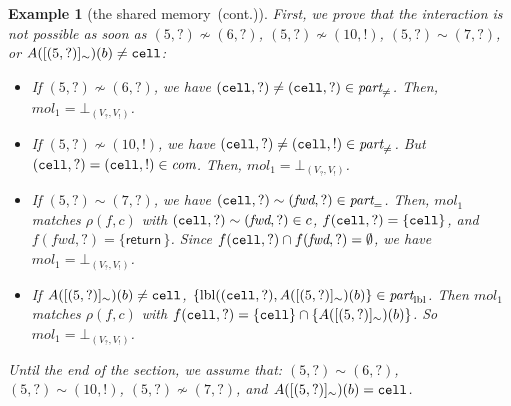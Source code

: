 \documentclass{article}
\newtheorem{example}[thm]{Example}
\newcommand{\rec}{?}
\newcommand{\eme}{!}
\newcommand{\internal}[1]{\textnormal{\texttt{#1}}}
\newcommand{\data}[1]{\textsf{#1}\,}
\newcommand{\variable}[1]{\textit{#1}}
\newcommand{\addread}{\data{return}}
\newcommand{\port}{\variable{fwd}}
\newcommand{\ccell}{\internal{cell}}
\newcommand{\memlabe}{5}
\newcommand{\memlabf}{6}
\newcommand{\memlabg}{7}
\newcommand{\memlabj}{10}
\newcommand{\Vrec}{V_{\rec}}
\newcommand{\Veme}{V_{\eme}}
\newcommand{\continued}{(cont.)}
\newcommand{\Moleculeshortkey}{}
\newcommand{\botmolecule}[2]{\bot^{\Moleculeshortkey}_{\scriptscriptstyle ({\scriptscriptstyle #1},{\scriptscriptstyle #2})}}
\newcommand{\shareanalysis}{the shared memory}
\newcommand{\cflowanalysis}{\shareanalysis\ \continued}
\begin{document}
\begin{example}[\cflowanalysis]
First, we prove that the interaction is not possible as soon as 
$(\memlabe,\rec)\not \sim (\memlabf,\rec)$, $(\memlabe,\rec)\not \sim(\memlabj,\eme)$, $(\memlabe,\rec)\sim(\memlabg,\rec)$, or   $A([(\memlabe,\rec)]_\sim)(b)\not =\ccell$:
\begin{itemize} 
\item If $(\memlabe,\rec)\not \sim (\memlabf,\rec)$, we have  $(\ccell,\rec)\not=(\ccell,\rec)\in\textit{part}_{\not =}$. Then,  $\textit{mol}_1 = \botmolecule{\Vrec}{\Veme}$.
\item If $(\memlabe,\rec)\not \sim (\memlabj,\eme)$, we have  $(\ccell,\rec)\not=(\ccell,\eme)\in\textit{part}_{\not =}$. 
But $(\ccell,\rec)=(\ccell,\eme)\in\textit{com}$. 
Then, $\textit{mol}_1 =\botmolecule{\Vrec}{\Veme}$.
\item 
If $(\memlabe,\rec)\sim(\memlabg,\rec)$, we have $(\ccell,\rec)\sim(\port,\rec)\in\textit{part}_=$.
Then, $\textit{mol}_1$ matches $\rho(f,c)$ with $(\ccell,\rec)\sim(\port,\rec)\in c$, $f(\ccell,\rec)=\{\ccell\}$, and $f(\port,\rec)=\{\addread\}$.
Since $f(\ccell,\rec)\cap f(\port,\rec)=\emptyset$, we have $\textit{mol}_1 = \botmolecule{\Vrec}{\Veme}$.
\item 
If  $A([(\memlabe,\rec)]_\sim)(b)\not =\ccell$, 
 $\{\textrm{lbl}((\ccell,\rec),A([(\memlabe,\rec)]_{\sim})(b)\}\in\textit{part}_{\text{lbl}}$. Then $\textit{mol}_1$ matches $\rho(f,c)$ with 
$f(\ccell,\rec)=\{\ccell\}\cap\{A([(\memlabe,\rec)]_{\sim})(b)\}$. So 
$\textit{mol}_1=\botmolecule{\Vrec}{\Veme}$.
\end{itemize}

Until the end of the section, we assume that: $(\memlabe,\rec) \sim (\memlabf,\rec)$, $(\memlabe,\rec) \sim (\memlabj,\eme)$, $(\memlabe,\rec)\not\sim (\memlabg,\rec)$, and $A([(\memlabe,\rec)]_\sim)(b)=\ccell$. 


\end{example}
\end{document}
